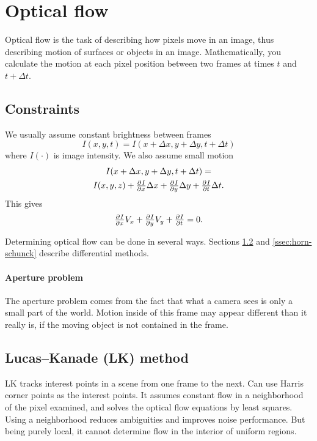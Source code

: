 \section{Optical flow}
Optical flow is the task of describing how pixels move in an image, thus describing motion of surfaces or objects in an image. Mathematically, you calculate the motion at each pixel position between two frames at times $t$ and $t + \Delta t$.

\subsection{Constraints}
We usually assume constant brightness between frames
\begin{equation}
    I(x,y,t) = I(x + \Delta x, y + \Delta y, t + \Delta t)
\end{equation}
where $I(\cdot)$ is image intensity. We also assume small motion
\begin{multline}
    I(x + \Delta x, y + \Delta y, t + \Delta t) =\\
    I(x,y,z) + \pd{I}{x}\Delta x + \pd{I}{y}\Delta y + \pd{I}{t} \Delta t.
\end{multline}
This gives
\begin{equation}
    \pd{I}{x} V_x + \pd{I}{y} V_y + \pd{I}{t} = 0.
\end{equation}

Determining optical flow can be done in several ways. Sections \ref{ssec:lucas-kanade} and \ref{ssec:horn-schunck} describe differential methods.

\paragraph{Aperture problem} The aperture problem comes from the fact that what a camera sees is only a small part of the world. Motion inside of this frame may appear different than it really is, if the moving object is not contained in the frame.

\subsection{Lucas--Kanade (LK) method}\label{ssec:lucas-kanade}
LK tracks interest points in a scene from one frame to the next. Can use Harris corner points as the interest points. It assumes constant flow in a neighborhood of the pixel examined, and solves the optical flow equations by least squares. Using a neighborhood reduces ambiguities and improves noise performance. But being purely local, it cannot determine flow in the interior of uniform regions.

